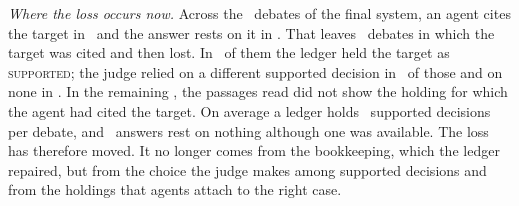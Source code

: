 \documentclass[conference]{IEEEtran}
\begin{document}
\emph{Where the loss occurs now.} Across the \ResFinalLossCases\ debates of the final system, an agent cites the target in \ResFinalLossCited\ and the answer rests on it in \ResFinalLossInAnswer. That leaves \ResFinalLossLost\ debates in which the target was cited and then lost. In \ResFinalLossLostSupported\ of them the ledger held the target as \textsc{supported}; the judge relied on a different supported decision in \ResFinalLossLostSupportedOtherCase\ of those and on none in \ResFinalLossLostSupportedNothing. In the remaining \ResFinalLossLostNotSupported, the passages read did not show the holding for which the agent had cited the target. On average a ledger holds \ResFinalLossSupportedPerDebate\ supported decisions per debate, and \ResFinalLossEmptyAlthoughSupported\ answers rest on nothing although one was available. The loss has therefore moved. It no longer comes from the bookkeeping, which the ledger repaired, but from the choice the judge makes among supported decisions and from the holdings that agents attach to the right case.
\end{document}
